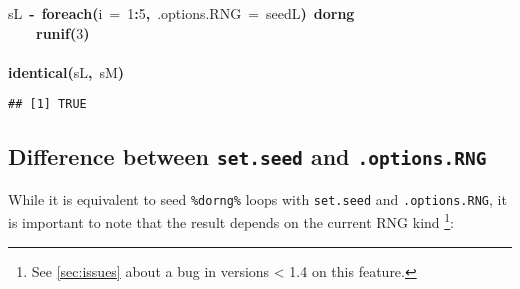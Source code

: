 \documentclass[a4paper,12pt]{article}\usepackage{graphicx, color}
\makeatletter
\newcommand{\hlnumber}[1]{\textcolor[rgb]{0,0,0}{#1}}%
\newcommand{\hlfunctioncall}[1]{\textcolor[rgb]{0.501960784313725,0,0.329411764705882}{\textbf{#1}}}%
\newcommand{\hlkeyword}[1]{\textcolor[rgb]{0,0,0}{\textbf{#1}}}%
\newcommand{\hlargument}[1]{\textcolor[rgb]{0.690196078431373,0.250980392156863,0.0196078431372549}{#1}}%
\newcommand{\hlassignement}[1]{\textcolor[rgb]{0,0,0}{\textbf{#1}}}%
\newcommand{\hlsymbol}[1]{\textcolor[rgb]{0,0,0}{#1}}%
\newcommand{\hlstd}[1]{\textcolor[rgb]{0,0,0}{#1}}%
\newenvironment{kframe}{%
 \def\FrameCommand##1{\hskip\@totalleftmargin \hskip-\fboxsep
 \colorbox{shadecolor}{##1}\hskip-\fboxsep
     \hskip-\linewidth \hskip-\@totalleftmargin \hskip\columnwidth}%
 \MakeFramed {\advance\hsize-\width
   \@totalleftmargin\z@ \linewidth\hsize
   \@setminipage}}%
 {\par\unskip\endMakeFramed}
\newenvironment{knitrout}{}{} %
\renewenvironment{knitrout}{\begin{footnotesize}}{\end{footnotesize}}
\let\code=\texttt
\newcommand{\dorng}{\code{\%dorng\%}\xspace}
\makeatother
\begin{document}
\begin{description}
\begin{knitrout}
\begin{kframe}
\begin{flushleft}
\hlstd{}\hlsymbol{sL}{\ }\hlassignement{\usebox{\hlnormalsizeboxlessthan}-}{\ }\hlfunctioncall{foreach}\hlkeyword{(}\hlargument{i}{\ }\hlargument{=}{\ }\hlnumber{1}\hlkeyword{:}\hlnumber{5}\hlkeyword{,}{\ }\hlargument{.options.RNG}{\ }\hlargument{=}{\ }\hlsymbol{seedL}\hlkeyword{)}{\ }\hlkeyword{\usebox{\hlnormalsizeboxpercent}dorng\usebox{\hlnormalsizeboxpercent}}{\ }\hlkeyword{\usebox{\hlnormalsizeboxopenbrace}}\hspace*{\fill}\\
\hlstd{}{\ }{\ }{\ }{\ }\hlfunctioncall{runif}\hlkeyword{(}\hlnumber{3}\hlkeyword{)}\hspace*{\fill}\\
\hlstd{}\hlkeyword{\usebox{\hlnormalsizeboxclosebrace}}\hspace*{\fill}\\
\hlstd{}\hlfunctioncall{identical}\hlkeyword{(}\hlsymbol{sL}\hlkeyword{,}{\ }\hlsymbol{sM}\hlkeyword{)}\mbox{}
\normalfont
\end{flushleft}
\begin{verbatim}
## [1] TRUE
\end{verbatim}
\end{kframe}
\end{knitrout}

\end{description}

\subsection{Difference between \texttt{set.seed} and \texttt{.options.RNG}}
\label{sec:set_seed}

While it is equivalent to seed \dorng loops with \code{set.seed} and \code{.options.RNG},
it is important to note that the result depends on the current RNG kind
\footnote{See \cref{sec:issues} about a bug in versions < 1.4 on this feature.}:
\end{document}
